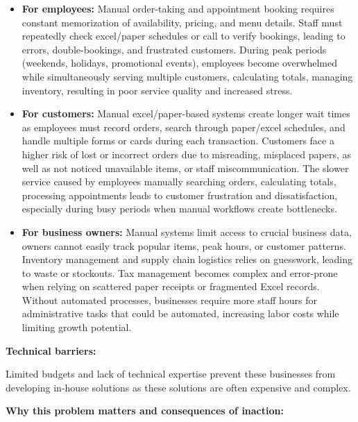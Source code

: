\documentclass[]{VUMIFTemplateClass}
\newcommand{\todocomment}[1]{%
    \begin{tcolorbox}[colback=red!20, colframe=red!60, arc=0pt, outer arc=0pt, boxrule=1pt, left=3pt, right=3pt, top=3pt, bottom=3pt]
        \textbf{\textcolor{orange!70!black}{TODO:}} #1
    \end{tcolorbox}
}
\begin{document}
\begin{itemize}
    \item \textbf{For employees:} Manual order-taking and appointment booking
    requires constant memorization of availability, pricing, and menu
    details. Staff must repeatedly check excel/paper schedules or call to verify
    bookings, leading to errors, double-bookings, and frustrated
    customers. During peak periods (weekends, holidays, promotional events),
    employees become overwhelmed while simultaneously serving multiple customers, calculating totals, managing inventory, resulting in poor service quality and
    increased stress.

    \item \textbf{For customers:} Manual excel/paper-based systems create
    longer wait times as employees must record orders, search
    through paper/excel schedules, and handle multiple forms or cards during each transaction. Customers face a higher risk of lost or incorrect orders due to misreading, misplaced papers, as well as not noticed unavailable items, or staff miscommunication. The slower service caused by employees manually searching orders, calculating totals, processing
    appointments leads to customer frustration and
    dissatisfaction, especially during busy periods when manual
    workflows create bottlenecks.

    \item \textbf{For business owners:} Manual systems limit access to crucial business data, owners cannot easily track popular items, peak hours, or customer patterns. Inventory management and supply chain logistics relies on guesswork, leading to waste or stockouts. Tax management becomes complex and error-prone when relying on scattered paper receipts or fragmented Excel records. Without automated processes,
    businesses require more staff hours for administrative tasks that could be
    automated, increasing labor costs while limiting growth potential.
\end{itemize}

\newpage
\textbf{Technical barriers:}

Limited budgets and lack of technical expertise prevent these businesses from
developing in-house solutions as these solutions are often expensive and complex.

\textbf{Why this problem matters and consequences of inaction:}
\end{document}
